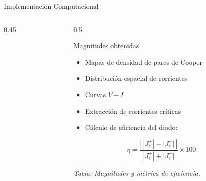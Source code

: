 \documentclass[aspectratio=169]{beamer}
\begin{document}
{\begin{frame}{Implementación Computacional}
\begin{columns}[c]
\begin{column}{0.45\textwidth}
      \end{column}

      \begin{column}{0.5\textwidth}

        \begin{block}{\centering \scriptsize Magnitudes obtenidas}
          \vspace{0.1cm}
          \begin{itemize}
            \item Mapas de densidad de pares de Cooper
            \item Distribución espacial de corrientes
            \item Curvas $V-I$
            \item Extracción de corrientes críticas
            \item Cálculo de eficiencia del diodo:
          \end{itemize}
          \vspace{0.2cm}
          \centering
          \[
            \eta = \frac{\left|\, |J_c^+|-|J_c^-| \,\right|}{|J_c^+|+|J_c^-|} \times 100
          \]
          \vspace{0.1cm}
        \end{block}
        \centering\textit{Tabla: Magnitudes y métrica de eficiencia.}

      \end{column}

    \end{columns}
  \end{frame}
}





\end{document}
